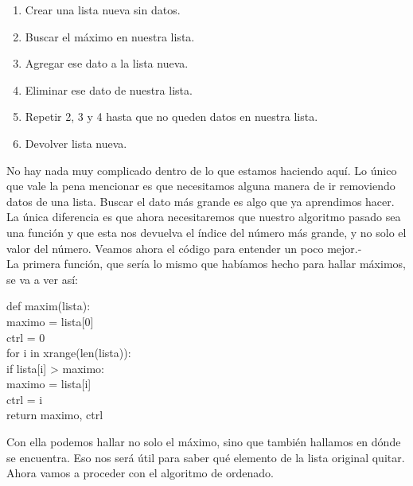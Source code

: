 \documentclass[10pt,letterpaper]{article}
\newenvironment{Code}
{
\begin{lrbox}{\selvestebox}%
\begin{minipage}{\dimexpr\columnwidth-2\fboxsep\relax}
\fontfamily{\ttdefault}\selectfont
}
{\end{minipage}\end{lrbox}%
\begin{center}
\colorbox{light-gray}{\usebox{\selvestebox}}
\end{center}
}
\begin{document}
\begin{enumerate}
\item Crear una lista nueva sin datos.
\item Buscar el m\'aximo en nuestra lista.
\item Agregar ese dato a la lista nueva.
\item Eliminar ese dato de nuestra lista.
\item Repetir 2, 3 y 4 hasta que no queden datos en nuestra lista.
\item Devolver lista nueva.
\end{enumerate}

No hay nada muy complicado dentro de lo que estamos haciendo aqu\'i. Lo \'unico que vale la pena mencionar es que necesitamos alguna manera de ir removiendo datos de una lista. Buscar el dato m\'as grande es algo que ya aprendimos hacer. La \'unica diferencia es que ahora necesitaremos que nuestro algoritmo pasado sea una funci\'on y que esta nos devuelva el \'indice del n\'umero m\'as grande, y no solo el valor del n\'umero. Veamos ahora el c\'odigo para entender un poco mejor.-\\

La primera funci\'on, que ser\'ia lo mismo que hab\'iamos hecho para hallar m\'aximos, se va a ver as\'i:

\begin{footnotesize}
\begin{Code}
def maxim(lista):\\
\hspace*{5mm} maximo = lista[0]\\
\hspace*{5mm} ctrl = 0\\
\hspace*{5mm} for i in xrange(len(lista)):\\
\hspace*{11mm} if lista[i] > maximo:\\
\hspace*{17mm} maximo = lista[i]\\
\hspace*{17mm} ctrl = i\\
\hspace*{5mm} return maximo, ctrl
\end{Code}
\end{footnotesize}

Con ella podemos hallar no solo el m\'aximo, sino que tambi\'en hallamos en d\'onde se encuentra. Eso nos ser\'a \'util para saber qu\'e elemento de la lista original quitar. Ahora vamos a proceder con el algoritmo de ordenado.
\end{document}
